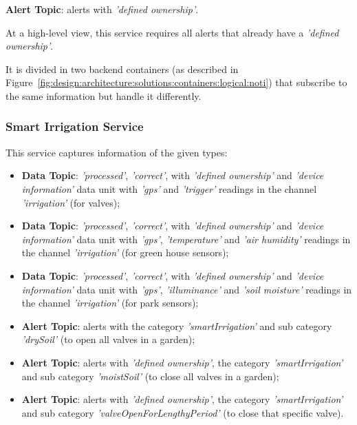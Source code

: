 \textbf{Alert Topic}: alerts with \textit{'defined ownership'}.

At a high-level view, this service requires all alerts that already have a \textit{'defined ownership'}.

It is divided in two backend containers (as described in Figure~\ref{fig:design:architecture:solutions:containers:logical:noti}) that subscribe to the same information but handle it differently.

\subsubsection{Smart Irrigation Service}
\label{subsubsec:implementation:description:services:irrigation}

This service captures information of the given types:

\begin{itemize}
    \item \textbf{Data Topic}: \textit{'processed'}, \textit{'correct'}, with \textit{'defined ownership'} and \textit{'device information'} data unit with \textit{'gps'} and \textit{'trigger'} readings in the channel \textit{'irrigation'} (for valves);
    \item \textbf{Data Topic}: \textit{'processed'}, \textit{'correct'}, with \textit{'defined ownership'} and \textit{'device information'} data unit with \textit{'gps'}, \textit{'temperature'} and \textit{'air humidity'} readings in the channel \textit{'irrigation'} (for green house sensors);
    \item \textbf{Data Topic}: \textit{'processed'}, \textit{'correct'}, with \textit{'defined ownership'} and \textit{'device information'} data unit with \textit{'gps'}, \textit{'illuminance'} and \textit{'soil moisture'} readings in the channel \textit{'irrigation'} (for park sensors);
    \item \textbf{Alert Topic}: alerts with the category \textit{'smartIrrigation'} and sub category \textit{'drySoil'} (to open all valves in a garden);
    \item \textbf{Alert Topic}: alerts with \textit{'defined ownership'}, the category \textit{'smartIrrigation'} and sub category \textit{'moistSoil'} (to close all valves in a garden);
    \item \textbf{Alert Topic}: alerts with \textit{'defined ownership'}, the category \textit{'smartIrrigation'} and sub category \textit{'valveOpenForLengthyPeriod'} (to close that specific valve).
\end{itemize}

